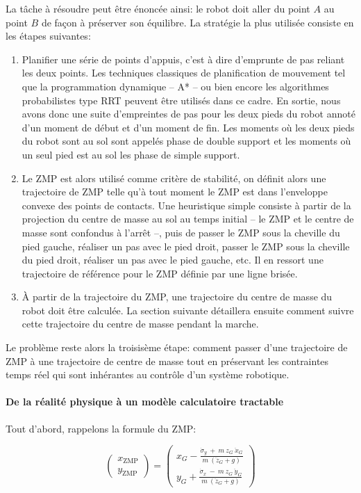 La tâche à résoudre peut être énoncée ainsi: le robot doit aller du
point $A$ au point $B$ de façon à préserver son équilibre. La
stratégie la plus utilisée consiste en les étapes suivantes:
\begin{enumerate}
\item Planifier une série de points d'appuis, c'est à dire d'emprunte
  de pas reliant les deux points. Les techniques classiques de
  planification de mouvement tel que la programmation dynamique -- A*
  -- ou bien encore les algorithmes probabilistes type RRT peuvent
  être utilisés dans ce cadre. En sortie, nous avons donc une suite
  d'empreintes de pas pour les deux pieds du robot annoté d'un moment
  de début et d'un moment de fin. Les moments où les deux pieds du
  robot sont au sol sont appelés phase de double support et les
  moments où un seul pied est au sol les phase de simple support.
\item Le ZMP est alors utilisé comme critère de stabilité, on définit
  alors une trajectoire de ZMP telle qu'à tout moment le ZMP est dans
  l'enveloppe convexe des points de contacts. Une heuristique simple
  consiste à partir de la projection du centre de masse au sol au
  temps initial -- le ZMP et le centre de masse sont confondus à
  l'arrêt --, puis de passer le ZMP sous la cheville du pied gauche,
  réaliser un pas avec le pied droit, passer le ZMP sous la cheville
  du pied droit, réaliser un pas avec le pied gauche, etc. Il en
  ressort une trajectoire de référence pour le ZMP définie par une
  ligne brisée.
\item À partir de la trajectoire du ZMP, une trajectoire du centre de
  masse du robot doit être calculée. La section suivante détaillera
  ensuite comment suivre cette trajectoire du centre de masse pendant
  la marche.
\end{enumerate}

Le problème reste alors la troisisème étape: comment passer d'une
trajectoire de ZMP à une trajectoire de centre de masse tout en
préservant les contraintes temps réel qui sont inhérantes au contrôle
d'un système robotique.

\paragraph{De la réalité physique à un modèle calculatoire tractable}

Tout d'abord, rappelons la formule du ZMP:

\begin{equation}
\left(
\begin{array}{cc}
x_{\text{ZMP}}\\
y_{\text{ZMP}}
\end{array}
\right) = \left(
\begin{array}{cc}
x_G - \frac{\dot{\sigma}_y\ +\ m\ z_G\ \ddot{x}_G}{m\ (\ddot{z}_G + g)}\\
y_G + \frac{\dot{\sigma}_x\ -\ m\ z_G\ \ddot{y}_G}{m\ (\ddot{z}_G + g)}
\end{array}
\right)
\end{equation}

